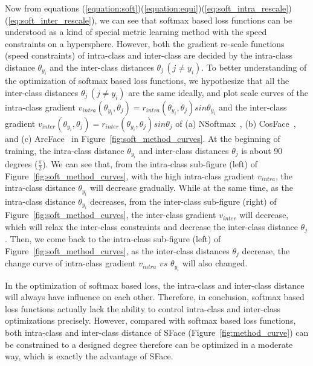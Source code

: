 \documentclass[journal,comsoc]{IEEEtran}
\begin{document}
Now from equations (\ref{equation:soft})(\ref{equation:equi})(\ref{eq:soft_intra_rescale})(\ref{eq:soft_inter_rescale}), we can see that softmax based loss functions can be understood as a kind of special metric learning method with the speed constraints on a hypersphere. However, both the gradient re-scale functions (speed constraints) of intra-class and inter-class are decided by the intra-class distance ${\theta_{y_i}}$ and the inter-class distances $\theta _{{j}}\,(j \ne {y_i})$. To better understanding of the optimization of softmax based loss functions, we hypothesize that all the inter-class distances $\theta _{{j}}\,(j \ne {y_i})$ are the same ideally, and plot scale curves of the intra-class gradient ${v_{intra}}\left( {{\theta _{{y_i}}}},{{\theta _j}} \right)={r_{intra}}\left( {{\theta _{{y_i}}}},{{\theta _j}} \right)sin\theta_{y_i}$ and the inter-class gradient ${v_{inter}}\left( {{\theta _{{y_i}}}}, {{\theta _j}} \right)={r_{inter}}\left( {{\theta _{{y_i}}}}, {{\theta _j}} \right)sin\theta_j$ of (a) NSoftmax~\cite{wang2017normface}, (b) CosFace~\cite{Wang2018CosFace}, and (c) ArcFace~\cite{deng2019arcface} in Figure~\ref{fig:soft_method_curves}. At the beginning of training, the intra-class distance $\theta_{y_i}$ and inter-class distances $\theta_j$ is about 90 degrees ($\frac{\pi}{2}$). We can see that, from the intra-class sub-figure (left) of Figure~\ref{fig:soft_method_curves}, with the high intra-class gradient ${v_{intra}}$, the intra-class distance $\theta_{y_i}$ will decrease gradually. While at the same time, as the intra-class distance $\theta_{y_i}$ decreases, from the inter-class sub-figure (right) of Figure~\ref{fig:soft_method_curves}, the inter-class gradient ${v_{inter}}$ will decrease, which will relax the inter-class constraints and decrease the inter-class distance $\theta_j$. Then, we come back to the intra-class sub-figure (left) of Figure~\ref{fig:soft_method_curves}, as the inter-class distances $\theta_j$ decrease, the change curve of intra-class gradient ${v_{intra}}$ $vs$ $\theta_{y_i}$ will also changed. 

In the optimization of softmax based loss, the intra-class and inter-class distance will always have influence on each other. Therefore, in conclusion, softmax based loss functions actually lack the ability to control intra-class and inter-class optimizations precisely. However, compared with softmax based loss functions, both intra-class and inter-class distance of SFace (Figure~\ref{fig:method_curve}) can be constrained to a designed degree therefore can be optimized in a moderate way, which is exactly the advantage of SFace.   
\end{document}
